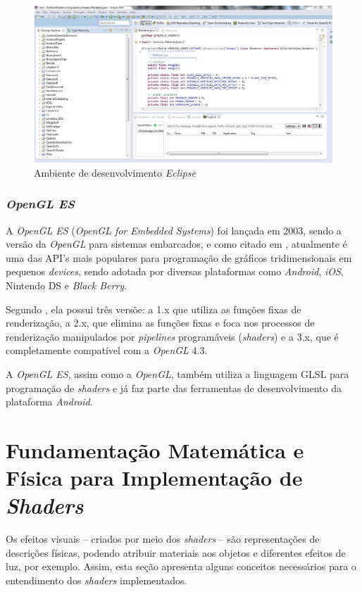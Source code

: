 	\begin{figure}[ht]
	\centering
		\includegraphics[keepaspectratio=true,scale=0.35]{figuras/eclipse.jpg}
	\caption{Ambiente de desenvolvimento \textit{Eclipse}}
	\label{eclipse}
	\end{figure}

	\subsubsection{\textit{OpenGL ES}}
	
	A \textit{OpenGL ES} (\textit{OpenGL for Embedded Systems}) foi lançada em 2003, sendo a versão da \textit{OpenGL} para sistemas embarcados, e como citado em \cite{guha2011}, atualmente é uma das API's mais populares para programação de gráficos tridimensionais em pequenos \textit{devices}, sendo adotada por diversas plataformas como \textit{Android}, \textit{iOS}, Nintendo DS e \textit{Black Berry}.

	Segundo \cite{opengles2012}, ela possui três versõe: a 1.x que utiliza as funções fixas de renderização, a 2.x, que elimina as funções fixas e foca nos processos de renderização manipulados por \textit{pipelines} programáveis (\textit{shaders}) e a 3.x, que é completamente compatível com a  \textit{OpenGL} 4.3.  

	A \textit{OpenGL ES}, assim como a \textit{OpenGL}, também utiliza a linguagem GLSL para programação de \textit{shaders} e  já faz parte das ferramentas de desenvolvimento da plataforma \textit{Android}. 


\section{Fundamentação Matemática e Física para Implementação de \textit{Shaders}}
\label{teoria}

	Os efeitos visuais -- criados por meio dos \textit{shaders} -- são representações de descrições físicas, podendo atribuir materiais aos objetos e diferentes efeitos de luz, por exemplo. Assim, esta seção apresenta alguns conceitos necessários para o entendimento dos \textit{shaders} implementados.

